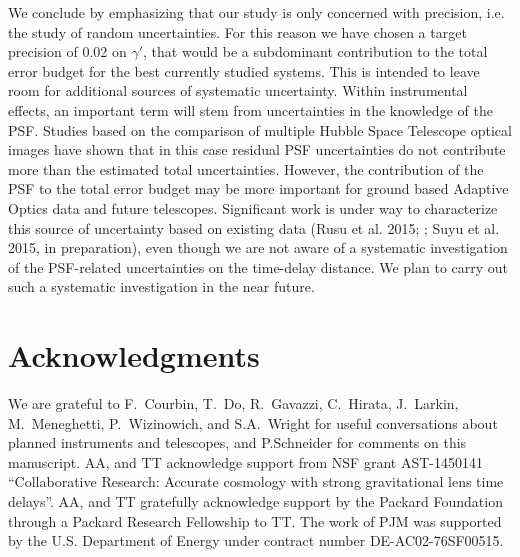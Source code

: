 \documentclass[a4paper,11pt]{article}
\begin{document}
We conclude by emphasizing that our study is only concerned with
precision, i.e. the study of random uncertainties. For this reason we
have chosen a target precision of 0.02 on $\gamma'$, that would be a
subdominant contribution to the total error budget for the best
currently studied systems. This is intended to leave room for
additional sources of systematic uncertainty. Within instrumental
effects, an important term will stem from uncertainties in the
knowledge of the PSF. Studies based on the comparison of multiple
Hubble Space Telescope optical images have shown that in this case
residual PSF uncertainties do not contribute more than the estimated
total uncertainties. However, the contribution of the PSF to the total
error budget may be more important for ground based Adaptive Optics
data and future telescopes. Significant work is under way to
characterize this source of uncertainty based on existing data (Rusu
et al. 2015; \cite{2015arXiv150605147R}; Suyu et al. 2015, in
preparation), even though we are not aware of a systematic
investigation of the PSF-related uncertainties on the time-delay
distance. We plan to carry out such a systematic investigation in the
near future.

\section*{Acknowledgments}

We are grateful to F.~Courbin, T.~Do, R.~Gavazzi, C.~Hirata,
J.~Larkin, M.~Meneghetti, P.~Wizinowich, and S.A.~Wright for useful
conversations about planned instruments and telescopes, and
P.Schneider for comments on this manuscript. AA, and TT acknowledge
support from NSF grant AST-1450141 ``Collaborative Research: Accurate
cosmology with strong gravitational lens time delays''. AA, and TT
gratefully acknowledge support by the Packard Foundation through a
Packard Research Fellowship to TT.  The work of PJM was supported by
the U.S.  Department of Energy under contract number
DE-AC02-76SF00515.\\




\end{document}
